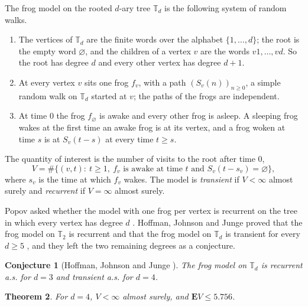 \documentclass[11pt]{amsart}
\newtheorem{theorem}{Theorem}[section]
\newtheorem{conjecture}[theorem]{Conjecture}
\theoremstyle{definition}
\numberwithin{equation}{section}
\newcommand{\lean}[1]{\ignorespaces}
\newcommand{\computed}[1]{\ignorespaces}
\newcommand{\nolean}[1]{\ignorespaces}
\newcommand{\T}{\mathbb{T}}
\newcommand{\E}{\mathbf{E}}
\begin{document}
The frog model on the rooted $d$-ary tree $\T_d$ is the following system of random walks.
\begin{enumerate}
\item The vertices of $\T_d$ are the finite words over the alphabet $\{1,\dots,d\}$; the root is the empty word $\varnothing$, and the children of a vertex $v$ are the words $v1,\dots,vd$. So the root has degree $d$ and every other vertex has degree $d+1$.
\item At every vertex $v$ sits one frog $f_v$, with a path $(S_v(n))_{n\ge0}$, a simple random walk on $\T_d$ started at $v$; the paths of the frogs are independent.
\item At time $0$ the frog $f_\varnothing$ is awake and every other frog is asleep. A sleeping frog wakes at the first time an awake frog is at its vertex, and a frog woken at time $s$ is at $S_v(t-s)$ at every time $t\ge s$.
\end{enumerate}
The quantity of interest is the number of visits to the root after time $0$,
\begin{equation}\label{eq:V}
V=\#\{(v,t):\ t\ge1,\ f_v \text{ is awake at time } t \text{ and } S_v(t-s_v)=\varnothing\},
\end{equation}
where $s_v$ is the time at which $f_v$ wakes. The model is \emph{transient} if $V<\infty$ almost surely and \emph{recurrent} if $V=\infty$ almost surely.

Popov asked whether the model with one frog per vertex is recurrent on the tree in which every vertex has degree $d$ \cite[Open Problem~4.1]{Pop03}. Hoffman, Johnson and Junge proved that the frog model on $\T_2$ is recurrent and that the frog model on $\T_d$ is transient for every $d\ge5$ \cite[Theorem~1]{HJJ17}, and they left the two remaining degrees as a conjecture.

\begin{conjecture}[{Hoffman, Johnson and Junge \cite[Conjecture~2, p.~2828]{HJJ17}}]\label{conj:HJJ}\nolean{a quoted conjecture, whose two cases are Theorems main and three}
The frog model on $\T_d$ is recurrent a.s. for $d = 3$ and transient a.s. for $d = 4$.
\end{conjecture}

\begin{theorem}\label{thm:main}\lean{FrogModel.transient_four, FrogModel.meanVisits_four_le, FrogModel.Transient, FrogModel.transient_four_of_data, FrogModel.meanVisits_four_le_of_data, FrogModel.meanVisits_four_le_exact_of_data}\computed{code/gp/small_checks.gp, code/gp/small_checks.out}
For $d=4$, $V<\infty$ almost surely, and $\E V\le5.756$.
\end{theorem}
\end{document}
